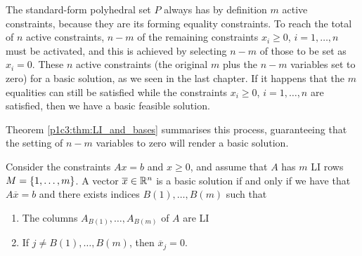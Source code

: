 The standard-form polyhedral set $P$ always has by definition $m$ active constraints, because they are its forming equality constraints. To reach the total of $n$ active constraints, $n-m$ of the remaining constraints $x_i \ge 0$, $i =1,\dots, n$ must be activated, and this is achieved by selecting $n-m$ of those to be set as $x_i = 0$. These $n$ active constraints (the original $m$ plus the $n-m$ variables set to zero) for a basic solution, as we seen in the last chapter. If it happens that the $m$ equalities can still be satisfied while the constraints $x_i \ge 0$, $i =1,\dots, n$ are satisfied, then we have a basic feasible solution.

Theorem \ref{p1c3:thm:LI_and_bases} summarises this process, guaranteeing that the setting of $n-m$ variables to zero will render a basic solution.

\begin{theorem} \label{p1c3:thm:LI_and_bases}
	Consider the constraints $Ax = b$ and $x \geq 0$, and assume that $A$ has $m$ LI rows $M = \left\{ 1,\dots,m \right \}$. A vector $\overline{x} \in \mathbb{R}^n$ is a basic solution if and only if we have that $A \overline{x} = b$ and there exists indices $B(1), \dots, B(m)$ such that
	\begin{enumerate}
		\item The columns $A_{B(1)}, \dots, A_{B(m)}$ of $A$ are LI
		\item If $j \neq B(1), \dots, B(m)$, then $\overline{x}_j = 0$.
	\end{enumerate} 
\end{theorem}

